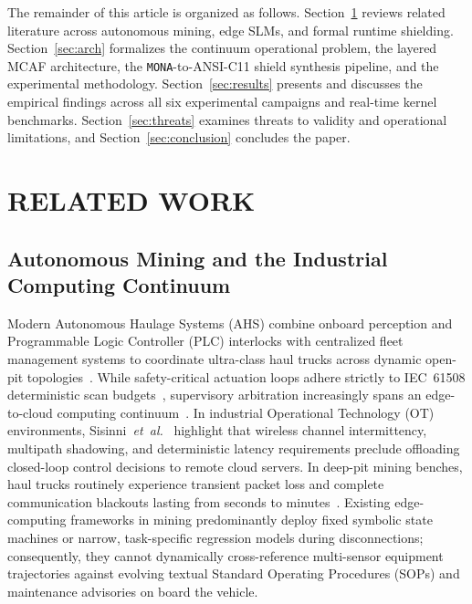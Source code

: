 \documentclass{ieeeaccess}
\begin{document}
The remainder of this article is organized as follows. Section~\ref{sec:related} reviews related literature across autonomous mining, edge SLMs, and formal runtime shielding. Section~\ref{sec:arch} formalizes the continuum operational problem, the layered MCAF architecture, the \texttt{MONA}-to-ANSI-C11 shield synthesis pipeline, and the experimental methodology. Section~\ref{sec:results} presents and discusses the empirical findings across all six experimental campaigns and real-time kernel benchmarks. Section~\ref{sec:threats} examines threats to validity and operational limitations, and Section~\ref{sec:conclusion} concludes the paper.

\section{RELATED WORK}
\label{sec:related}

\subsection{Autonomous Mining and the Industrial Computing Continuum}
Modern Autonomous Haulage Systems (AHS) combine onboard perception and Programmable Logic Controller (PLC) interlocks with centralized fleet management systems to coordinate ultra-class haul trucks across dynamic open-pit topologies~\cite{marshall2016robotics,iso17757}. While safety-critical actuation loops adhere strictly to IEC~61508 deterministic scan budgets~\cite{iec61508}, supervisory arbitration increasingly spans an edge-to-cloud computing continuum~\cite{balouek2019continuum}. In industrial Operational Technology (OT) environments, Sisinni~\emph{et~al.}~\cite{sisinni2018iiot} highlight that wireless channel intermittency, multipath shadowing, and deterministic latency requirements preclude offloading closed-loop control decisions to remote cloud servers. In deep-pit mining benches, haul trucks routinely experience transient packet loss and complete communication blackouts lasting from seconds to minutes~\cite{andrade2026mcaf}. Existing edge-computing frameworks in mining predominantly deploy fixed symbolic state machines or narrow, task-specific regression models during disconnections; consequently, they cannot dynamically cross-reference multi-sensor equipment trajectories against evolving textual Standard Operating Procedures (SOPs) and maintenance advisories on board the vehicle.
\end{document}
